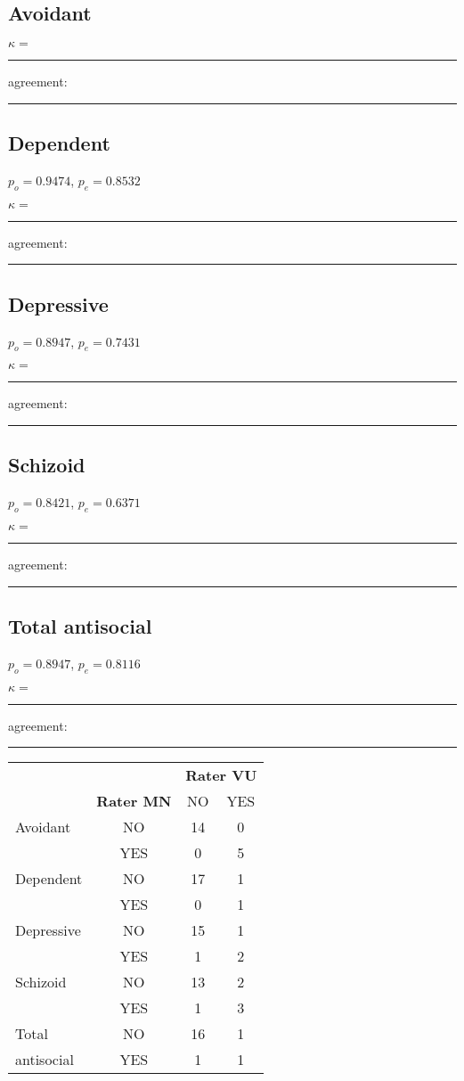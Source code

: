 \begin{minipage}{0.5\textwidth}
	\subsection{Avoidant} 
	$\kappa=$\rule{2cm}{0.4pt}\quad agreement: \rule{2cm}{0.4pt}

	\subsection{Dependent}
	$p_o=0.9474$, $p_e=0.8532$\medskip
	
	$\kappa=$\rule{2cm}{0.4pt}\quad agreement: \rule{2cm}{0.4pt}
	\subsection{Depressive}
	$p_o=0.8947$, $p_e=0.7431$\medskip
		
		$\kappa=$\rule{2cm}{0.4pt}\quad agreement: \rule{2cm}{0.4pt}
	\subsection{Schizoid}
	$p_o=0.8421$, $p_e=0.6371$\medskip
		
		$\kappa=$\rule{2cm}{0.4pt}\quad agreement: \rule{2cm}{0.4pt}
	\subsection{Total antisocial} 
	$p_o=0.8947$, $p_e=0.8116$\medskip
		
		$\kappa=$\rule{2cm}{0.4pt}\quad agreement: \rule{2cm}{0.4pt}
\end{minipage}	
\hfill
\begin{minipage}{0.4\textwidth}
	
	\begin{tabular}{lc|cc}
	\toprule
					& 			& \multicolumn{2}{c}{\textbf{Rater VU}} 	\\
					& \textbf{Rater MN}	& NO & YES\\
					\midrule
	Avoidant 		& NO		& 14 & 0\\
					& YES		& 0  & 5\\
					\midrule
	Dependent 		& NO		& 17 & 1\\
					& YES		& 0  & 1\\
				\midrule
	Depressive 		& NO		& 15 & 1\\
					& YES		& 1  & 2\\
				\midrule
	Schizoid 		& NO		& 13 & 2\\
					& YES		& 1  & 3\\
				\midrule
	Total  			& NO		& 16 & 1\\
	antisocial		& YES		& 1  & 1\\
					\bottomrule
	\end{tabular}

\end{minipage}

